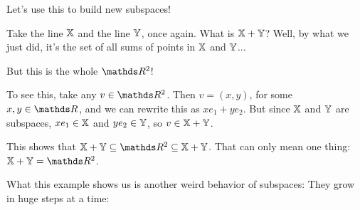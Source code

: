 \begin{ex}
	Let's use this to build new subspaces!
	
	Take the line $\mathbb X$ and the line $\mathbb Y$, once again. What is $\mathbb X+\mathbb Y$? Well, by what we just did, it's the set of all sums of points in $\mathbb X$ and $\mathbb Y$...
	
	But this is the whole $\R^2$!
	
	To see this, take any $v\in \R^2$. Then $v=(x,y)$, for some $x,y\in \R$, and we can rewrite this as $xe_1+ye_2$. But since $\mathbb X$ and $\mathbb Y$ are subspaces, $xe_1\in \mathbb X$ and $ye_2\in \mathbb Y$, so $v\in \mathbb X+\mathbb Y$.
	
	This shows that $\mb X+\mb Y\subseteq \R^2\subseteq \mb X+\mb Y $. That can only mean one thing: $\mb X+\mb Y=\R^2$.
\end{ex}

What this example shows us is another weird behavior of subspaces: They grow in huge steps at a time:

